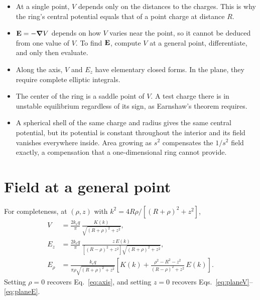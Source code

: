 \documentclass[11pt,a4paper]{article}
\newcommand{\ke}{k_e}
\begin{document}
\begin{itemize}
  \item At a single point, $V$ depends only on the distances to the charges. This is why the ring's central potential equals that of a point charge at distance $R$.
  \item $\vb E=-\grad V$ depends on how $V$ varies near the point, so it cannot be deduced from one value of $V$. To find $\vb E$, compute $V$ at a general point, differentiate, and only then evaluate.
  \item Along the axis, $V$ and $E_z$ have elementary closed forms. In the plane, they require complete elliptic integrals.
  \item The center of the ring is a saddle point of $V$. A test charge there is in unstable equilibrium regardless of its sign, as Earnshaw's theorem requires.
  \item A spherical shell of the same charge and radius gives the same central potential, but its potential is constant throughout the interior and its field vanishes everywhere inside. Area growing as $s^2$ compensates the $1/s^2$ field exactly, a compensation that a one-dimensional ring cannot provide.
\end{itemize}

\appendix
\section{Field at a general point}
For completeness, at $(\rho,z)$ with $k^2=4R\rho/\left[(R+\rho)^2+z^2\right]$,
\begin{align}
V&=\frac{2\ke q}{\pi}\,\frac{K(k)}{\sqrt{(R+\rho)^2+z^2}},\\
E_z&=\frac{2\ke q}{\pi}\,\frac{z\,E(k)}{\left[(R-\rho)^2+z^2\right]\sqrt{(R+\rho)^2+z^2}},\\
E_\rho&=\frac{\ke q}{\pi\rho\sqrt{(R+\rho)^2+z^2}}
\left[K(k)+\frac{\rho^2-R^2-z^2}{(R-\rho)^2+z^2}\,E(k)\right].
\end{align}
Setting $\rho=0$ recovers Eq.~\eqref{eq:axis}, and setting $z=0$ recovers Eqs.~\eqref{eq:planeV}--\eqref{eq:planeE}.
\end{document}

